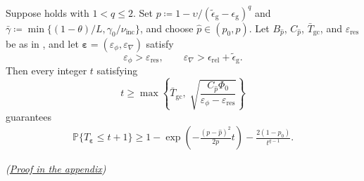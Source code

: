 \documentclass{article}
\begin{document}
\begin{theorem}
\label{thm:mu_zero_sfo_bzo}
Suppose  holds with \(1<q\le2\).
Set \(p\coloneqq 1-\upsilon/(\widetilde\epsilon_{\mathrm{g}}-\epsilon_{\mathrm{g}})^q\)
and \(\bar\gamma\coloneqq \min\{(1-\theta)/L,
\gamma_0/\nu_{\mathrm{inc}}\}\), and choose \(\hat p\in(p_0,p)\).
Let \(B_{\hat p}\), \(C_{\hat p}\), \(\bar T_{\mathrm{gc}}\), and
\(\varepsilon_{\mathrm{res}}\) be as in
, and let
\(\boldsymbol\varepsilon=(\varepsilon_\phi,\varepsilon_\nabla)\) satisfy
\begin{equation}\label{eq:precision_mu_zero_sfo}
\varepsilon_\phi>\varepsilon_{\mathrm{res}},
\qquad
\varepsilon_\nabla>\epsilon_{\mathrm{rel}}+\widetilde\epsilon_{\mathrm{g}}.
\end{equation}
Then every integer \(t\) satisfying
\begingroup{}
\begin{equation}\label{eq:complexity_mu_zero_sfo}
t\ge\max\left\{\bar T_{\mathrm{gc}},\;
\sqrt{\frac{C_{\hat p}\Phi_0}{\varepsilon_\phi-\varepsilon_{\mathrm{res}}}}\right\}
\end{equation}
guarantees
\begin{align}
\mathbb P\{T_{\boldsymbol\varepsilon}\le t+1\}
\ge1-\exp\left(-\frac{(p-\hat p)^2}{2p}t\right)
-\frac{2(1-p_0)}{t^{q-1}}.
\label{eq:probability_mu_zero_sfo}
\end{align}
\par\nobreak\hfill\textnormal{\small\itshape(\hyperref[proof:mu_zero_sfo_bzo]{Proof in the appendix})}\par
\endgroup
\end{theorem}
\end{document}
